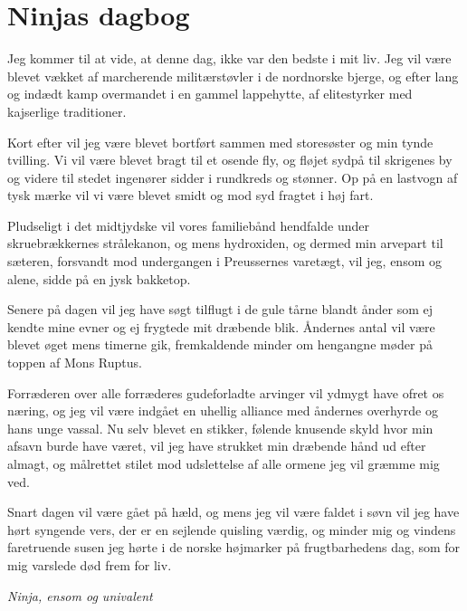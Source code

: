 

\begin{minipage}[b]{0.95\linewidth}
\begin{minipage}[t]{0.47\textwidth}
\vspace{3mm}
\section*{Ninjas dagbog}
Jeg kommer til at vide, at denne dag, ikke var den bedste i mit liv. Jeg vil være blevet vækket af marcherende militærstøvler i de nordnorske bjerge, og efter lang og indædt kamp overmandet i en gammel lappehytte, af elitestyrker med kajserlige traditioner.

Kort efter vil jeg være blevet bortført sammen med storesøster og min tynde tvilling. Vi vil være blevet bragt til et osende fly, og fløjet sydpå til skrigenes by og videre til stedet ingenører sidder i rundkreds og stønner. Op på en lastvogn af tysk mærke vil vi være blevet smidt og mod syd fragtet i høj fart.

Pludseligt i det midtjydske vil vores familiebånd hendfalde under skruebrækkernes strålekanon, og mens hydroxiden, og dermed min arvepart til sæteren, forsvandt mod undergangen i Preussernes varetægt, vil jeg, ensom og alene, sidde på en jysk bakketop.

Senere på dagen vil jeg have søgt tilflugt i de gule tårne blandt ånder som ej kendte mine evner og ej frygtede mit dræbende blik. Åndernes antal vil være blevet øget mens timerne gik, fremkaldende minder om hengangne møder på toppen af Mons Ruptus.

Forræderen over alle forræderes gudeforladte arvinger vil ydmygt have ofret os næring, og jeg vil være indgået en uhellig alliance med åndernes overhyrde og hans unge vassal. Nu selv blevet en stikker, følende knusende skyld hvor min afsavn burde have været, vil jeg have strukket min dræbende hånd ud efter almagt, og målrettet stilet mod udslettelse af alle ormene jeg vil græmme mig ved.

Snart dagen vil være gået på hæld, og mens jeg vil være faldet i søvn vil jeg have hørt syngende vers, der er en sejlende quisling værdig, og minder mig og vindens faretruende susen jeg hørte i de norske højmarker på frugtbarhedens dag, som for mig varslede død frem for liv.

{\flushright\emph{Ninja, ensom og univalent}}

\end{minipage}%
\hfill\begin{minipage}[t]{0.47\textwidth}
\vspace{3mm}

\end{minipage}
\end{minipage}
